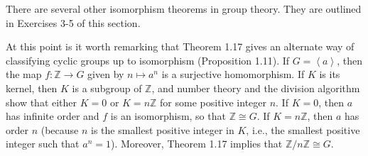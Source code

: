 \documentclass[leqno]{book}
\begin{document}
\noindent There are several other isomorphism theorems in group theory.  They are outlined in Exercises 3-5 of this section.

At this point is it worth remarking that Theorem 1.17 gives an alternate way of classifying cyclic groups up to isomorphism (Proposition 1.11).  If $G=\left<a\right>$, then the map $f:\mathbb Z\to G$ given by $n\mapsto a^n$ is a surjective homomorphism.  If $K$ is its kernel, then $K$ is a subgroup of $\mathbb Z$, and number theory and the division algorithm show that either $K=0$ or $K=n\mathbb Z$ for some positive integer $n$.  If $K=0$, then $a$ has infinite order and $f$ is an isomorphism, so that $\mathbb Z\cong G$.  If $K=n\mathbb Z$, then $a$ has order $n$ (because $n$ is the smallest positive integer in $K$, i.e., the smallest positive integer such that $a^n=1$).  Moreover, Theorem 1.17 implies that $\mathbb Z/n\mathbb Z\cong G$.
\end{document}
